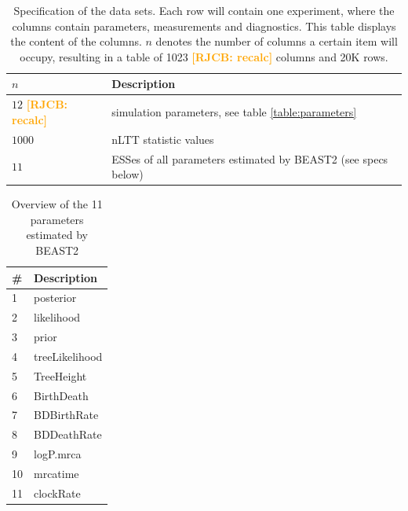 \documentclass{article}
\newcommand*\richel[1]{\textcolor{orange}{\textbf{[RJCB: #1]}}}
\begin{document}
\begin{table}
  \centering 
  \begin{tabular}{l l}
    \hline
    $n$ & Description \\
    \hline
    \hline
    $12$ \richel{recalc} & simulation parameters, see table \ref{table:parameters} \\
    $1000$ & nLTT statistic values \\
    $11$ & ESSes of all parameters estimated by BEAST2 (see specs below) \\
    \hline
  \end{tabular}
  \caption{
    Specification of the data sets. Each row will contain one experiment,
    where the columns contain parameters, measurements and diagnostics.
    This table displays the content of the columns. 
    $n$ denotes the number
    of columns a certain item will occupy, resulting in a table of 
    1023 \richel{recalc} columns and 20K rows.
  }
  \label{table:specs}
\end{table}

\begin{table}
  \centering 
  \begin{tabular}{l l}
    \hline
    \# & Description \\
    \hline
    \hline
    1 & posterior \\
    2 & likelihood \\
    3 & prior \\
    4 & treeLikelihood \\
    5 & TreeHeight \\
    6 & BirthDeath \\
    7 & BDBirthRate \\
    8 & BDDeathRate \\
    9 & logP.mrca \\
    10 & mrcatime \\
    11 & clockRate \\
    \hline
  \end{tabular}
  \caption{
    Overview of the 11 parameters estimated by BEAST2
  }
  \label{table:estimated_parameters}
\end{table}

\end{document}
